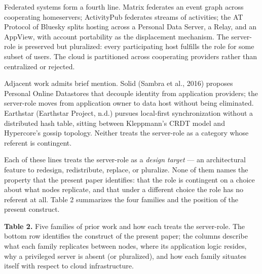\documentclass[
]{article}
\begin{document}
Federated systems form a fourth line. Matrix federates an event graph
across cooperating homeservers; ActivityPub federates streams of
activities; the AT Protocol of Bluesky splits hosting across a Personal
Data Server, a Relay, and an AppView, with account portability as the
displacement mechanism. The server-role is preserved but pluralized:
every participating host fulfills the role for some subset of users. The
cloud is partitioned across cooperating providers rather than
centralized or rejected.

Adjacent work admits brief mention. Solid (Sambra et al., 2016) proposes
Personal Online Datastores that decouple identity from application
providers; the server-role moves from application owner to data host
without being eliminated. Earthstar (Earthstar Project, n.d.) pursues
local-first synchronization without a distributed hash table, sitting
between Kleppmann's CRDT model and Hypercore's gossip topology. Neither
treats the server-role as a category whose referent is contingent.

Each of these lines treats the server-role as a \emph{design target} ---
an architectural feature to redesign, redistribute, replace, or
pluralize. None of them names the property that the present paper
identifies: that the role is contingent on a choice about what nodes
replicate, and that under a different choice the role has no referent at
all. Table 2 summarizes the four families and the position of the
present construct.

\textbf{Table 2.} Five families of prior work and how each treats the
server-role. The bottom row identifies the construct of the present
paper; the columns describe what each family replicates between nodes,
where its application logic resides, why a privileged server is absent
(or pluralized), and how each family situates itself with respect to
cloud infrastructure.
\end{document}
